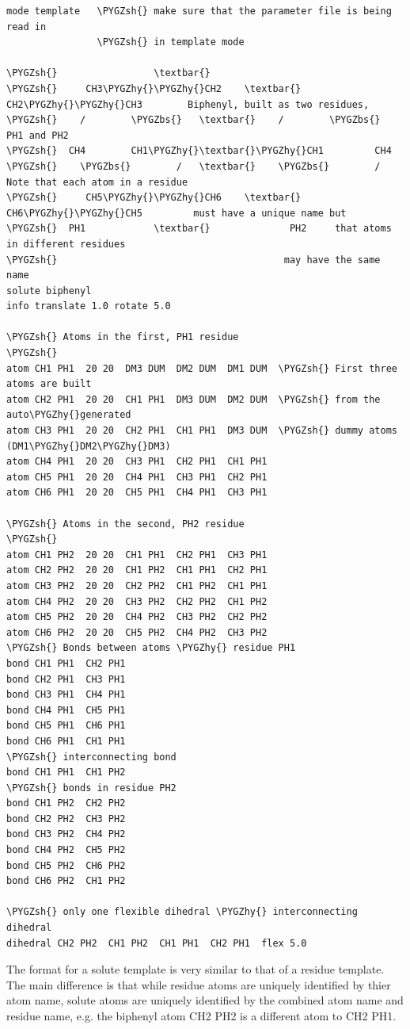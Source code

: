 \documentclass[letterpaper,10pt,english]{sphinxmanual}
\def\PYGZbs{\char`\\}
\def\PYGZsh{\char`\#}
\def\PYGZhy{\char`\-}
\begin{document}
\begin{Verbatim}[commandchars=\\\{\}]
mode template   \PYGZsh{} make sure that the parameter file is being read in
                \PYGZsh{} in template mode

\PYGZsh{}                 \textbar{}
\PYGZsh{}     CH3\PYGZhy{}\PYGZhy{}CH2    \textbar{}     CH2\PYGZhy{}\PYGZhy{}CH3        Biphenyl, built as two residues,
\PYGZsh{}    /        \PYGZbs{}   \textbar{}    /        \PYGZbs{}             PH1 and PH2
\PYGZsh{}  CH4        CH1\PYGZhy{}\textbar{}\PYGZhy{}CH1         CH4
\PYGZsh{}    \PYGZbs{}        /   \textbar{}    \PYGZbs{}        /        Note that each atom in a residue
\PYGZsh{}     CH5\PYGZhy{}\PYGZhy{}CH6    \textbar{}     CH6\PYGZhy{}\PYGZhy{}CH5         must have a unique name but
\PYGZsh{}  PH1            \textbar{}              PH2     that atoms in different residues
\PYGZsh{}                                        may have the same name
solute biphenyl
info translate 1.0 rotate 5.0

\PYGZsh{} Atoms in the first, PH1 residue
\PYGZsh{}
atom CH1 PH1  20 20  DM3 DUM  DM2 DUM  DM1 DUM  \PYGZsh{} First three atoms are built
atom CH2 PH1  20 20  CH1 PH1  DM3 DUM  DM2 DUM  \PYGZsh{} from the auto\PYGZhy{}generated
atom CH3 PH1  20 20  CH2 PH1  CH1 PH1  DM3 DUM  \PYGZsh{} dummy atoms (DM1\PYGZhy{}DM2\PYGZhy{}DM3)
atom CH4 PH1  20 20  CH3 PH1  CH2 PH1  CH1 PH1
atom CH5 PH1  20 20  CH4 PH1  CH3 PH1  CH2 PH1
atom CH6 PH1  20 20  CH5 PH1  CH4 PH1  CH3 PH1

\PYGZsh{} Atoms in the second, PH2 residue
\PYGZsh{}
atom CH1 PH2  20 20  CH1 PH1  CH2 PH1  CH3 PH1
atom CH2 PH2  20 20  CH1 PH2  CH1 PH1  CH2 PH1
atom CH3 PH2  20 20  CH2 PH2  CH1 PH2  CH1 PH1
atom CH4 PH2  20 20  CH3 PH2  CH2 PH2  CH1 PH2
atom CH5 PH2  20 20  CH4 PH2  CH3 PH2  CH2 PH2
atom CH6 PH2  20 20  CH5 PH2  CH4 PH2  CH3 PH2
\PYGZsh{} Bonds between atoms \PYGZhy{} residue PH1
bond CH1 PH1  CH2 PH1
bond CH2 PH1  CH3 PH1
bond CH3 PH1  CH4 PH1
bond CH4 PH1  CH5 PH1
bond CH5 PH1  CH6 PH1
bond CH6 PH1  CH1 PH1
\PYGZsh{} interconnecting bond
bond CH1 PH1  CH1 PH2
\PYGZsh{} bonds in residue PH2
bond CH1 PH2  CH2 PH2
bond CH2 PH2  CH3 PH2
bond CH3 PH2  CH4 PH2
bond CH4 PH2  CH5 PH2
bond CH5 PH2  CH6 PH2
bond CH6 PH2  CH1 PH2

\PYGZsh{} only one flexible dihedral \PYGZhy{} interconnecting dihedral
dihedral CH2 PH2  CH1 PH2  CH1 PH1  CH2 PH1  flex 5.0
\end{Verbatim}

The format for a solute template is very similar to that of a residue template. The main difference is that while residue atoms are uniquely identified by thier atom name, solute atoms are uniquely identified by the combined atom name and residue name, e.g. the biphenyl atom CH2 PH2 is a different atom to CH2 PH1.
\end{document}
